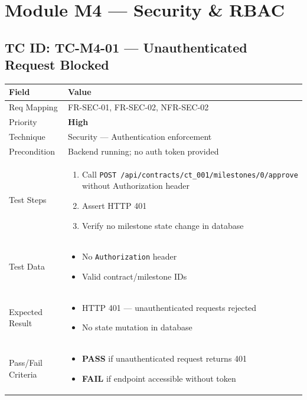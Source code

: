 \documentclass[12pt,a4paper]{article}
\newcommand{\sevhigh}{\textcolor{severityhigh}{\textbf{High}}}
\newcommand{\passresult}{\textcolor{passgreen}{\textbf{PASS}}}
\newcommand{\failresult}{\textcolor{failred}{\textbf{FAIL}}}
\begin{document}
\newpage

\section{Module M4 --- Security \& RBAC}

\subsection{TC ID: TC-M4-01 --- Unauthenticated Request Blocked}

\begin{tabular}{|p{}|p{}|}
\hline
\rowcolor{lightblue} \textbf{Field} & \textbf{Value} \\
\hline
Req Mapping & FR-SEC-01, FR-SEC-02, NFR-SEC-02 \\
\hline
Priority & \sevhigh \\
\hline
Technique & Security --- Authentication enforcement \\
\hline
Precondition & Backend running; no auth token provided \\
\hline
Test Steps &
\begin{enumerate}[nosep, leftmargin=*]
  \item Call \texttt{POST /api/contracts/ct\_001/milestones/0/approve} without Authorization header
  \item Assert HTTP 401
  \item Verify no milestone state change in database
\end{enumerate} \\
\hline
Test Data &
\begin{itemize}[nosep, leftmargin=*]
  \item No \texttt{Authorization} header
  \item Valid contract/milestone IDs
\end{itemize} \\
\hline
Expected Result &
\begin{itemize}[nosep, leftmargin=*]
  \item HTTP 401 --- unauthenticated requests rejected
  \item No state mutation in database
\end{itemize} \\
\hline
Pass/Fail Criteria &
\begin{itemize}[nosep, leftmargin=*]
  \item \passresult{} if unauthenticated request returns 401
  \item \failresult{} if endpoint accessible without token
\end{itemize} \\
\hline
\end{tabular}
\end{document}
